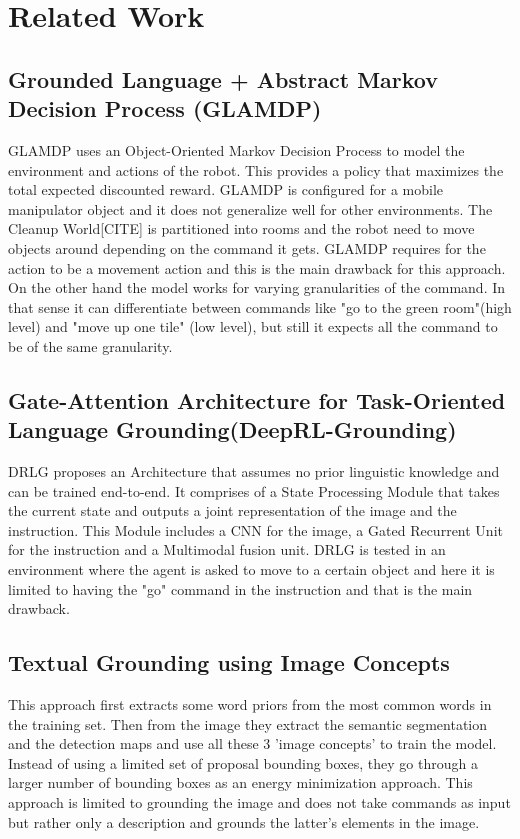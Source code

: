 \documentclass{article}
\title{}
\date{}
\author{Irdi Balla}
\begin{document}
	\maketitle	

	\section{Related Work}
	\subsection{Grounded Language + Abstract Markov Decision Process (GLAMDP)}	
	GLAMDP uses an Object-Oriented Markov Decision Process to model the environment and actions of the robot. This provides a policy that maximizes the total expected discounted reward. GLAMDP is configured for a mobile manipulator object and it does not generalize well for other environments. The Cleanup World[CITE] is partitioned into rooms and the robot need to move objects around depending on the command it gets. GLAMDP requires for the action to be a movement action and this is the main drawback for this approach. On the other hand the model works for varying granularities of the command. In that sense it can differentiate between commands like "go to the green room"(high level) and "move up one tile" (low level), but still it expects all the command to be of the same granularity.
	\subsection{Gate-Attention Architecture for Task-Oriented Language Grounding(DeepRL-Grounding)}
	DRLG proposes an Architecture that assumes no prior linguistic knowledge and can be trained end-to-end. It comprises of a State Processing Module that takes the current state and outputs a joint representation of the image and the instruction. This Module includes a CNN for the image, a Gated Recurrent Unit for the instruction and a Multimodal fusion unit. DRLG is tested in an environment where the agent is asked to move to a certain object and here it is limited to having the "go" command in the instruction and that is the main drawback.
	\subsection{Textual Grounding using Image Concepts}
	This approach first extracts some word priors from the most common words in the training set. Then from the image they extract the semantic segmentation and the detection maps and use all these 3 'image concepts' to train the model. Instead of using a limited set of proposal bounding boxes, they go through a larger number of bounding boxes as an energy minimization approach. This approach is limited to grounding the image and does not take commands as input but rather only a description and grounds the latter's elements in the image.
	
	
\end{document}
